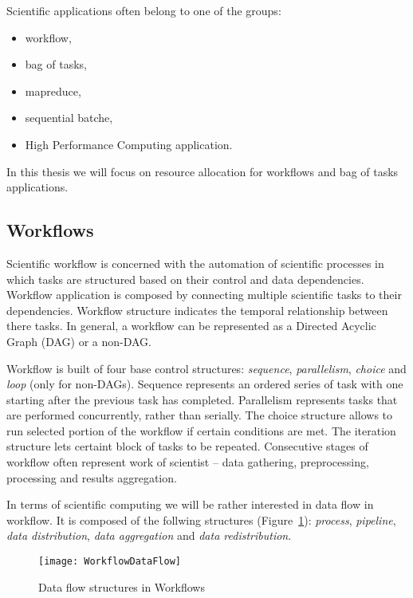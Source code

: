 Scientific applications often belong to one of the groups: 
\begin{itemize}
  \item workflow,
  \item bag of tasks,
  \item map\-reduce,  
  \item sequential batche,
  \item High Performance Computing application.
\end{itemize}

In this thesis we will focus on resource allocation for workflows and bag of tasks applications.

\subsection{Workflows}
\label{intro:workflow}

Scientific workflow is concerned with the automation of scientific processes in which tasks are structured based on their control and data dependencies\cite{Taylor:2006:WES:1196459}. Workflow application is composed by connecting multiple scientific tasks to their dependencies. Workflow structure indicates the temporal relationship between there tasks. In general, a workflow can be represented as a Directed Acyclic Graph (DAG) or a non-DAG. 

Workflow is built of four base control structures: \emph{sequence}, \emph{parallelism}, \emph{choice} and \emph{loop} (only for non-DAGs). Sequence represents an ordered series of task with one starting after the previous task has completed. Parallelism represents tasks that are performed concurrently, rather than serially. The choice structure allows to run selected portion of the workflow if certain conditions are met. The iteration structure lets certaint block of tasks to be repeated. Consecutive stages of workflow often represent work of scientist – data gathering, preprocessing, processing and results aggregation. 

In terms of scientific computing we will be rather interested in data flow in workflow. It is composed of the follwing structures (Figure~\ref{fig:intro:workflow:structures}): \emph{process}, \emph{pipeline}, \emph{data distribution}, \emph{data aggregation} and \emph{data redistribution}.

\begin{figure}[tb]
   \centering
   \texttt{[image: WorkflowDataFlow]}  
   \caption{Data flow structures in Workflows\cite{Bharathi08}}
   \label{fig:intro:workflow:structures}
\end{figure} 


